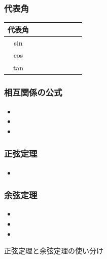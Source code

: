 \documentclass[10pt,dvipdfmx]{jsarticle}
\begin{document}
\subsubsection*{代表角}
{\renewcommand\arraystretch{2}
  \begin{table}[H]
    \begin{tabular}{|c||p{1.5cm}|p{1.5cm}|p{1.5cm}|p{1.5cm}|p{1.5cm}|p{1.5cm}|p{1.5cm}|}
      \hline
      代表角 &  &  &  &  &  &  & \\
      \hline
      sin    &  &  &  &  &  &  & \\
      \hline
      cos    &  &  &  &  &  &  & \\
      \hline
      tan    &  &  &  &  &  &  & \\
      \hline
    \end{tabular}
  \end{table}
}

\subsubsection*{相互関係の公式}
\begin{LARGE}
  \begin{itemize}
    \item
    \item
    \item
  \end{itemize}
\end{LARGE}

\subsubsection*{正弦定理}
\begin{LARGE}
  \begin{itemize}
    \item
  \end{itemize}
\end{LARGE}
\subsubsection*{余弦定理}
\begin{LARGE}
  \begin{itemize}
    \item  \item  \item
  \end{itemize}
\end{LARGE}

\begin{itembox}[l]{正弦定理と余弦定理の使い分け}
  \vspace{8mm}
\end{itembox}
\end{document}
